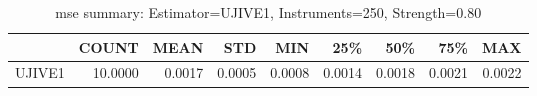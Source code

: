 \begin{table}[ht]
\centering
\caption{mse summary: Estimator=UJIVE1, Instruments=250, Strength=0.80}
\begin{tabular}{lrrrrrrrr}
\toprule
 & COUNT & MEAN & STD & MIN & 25\% & 50\% & 75\% & MAX \\
\midrule
UJIVE1 & 10.0000 & 0.0017 & 0.0005 & 0.0008 & 0.0014 & 0.0018 & 0.0021 & 0.0022 \\
\bottomrule
\end{tabular}
\end{table}

